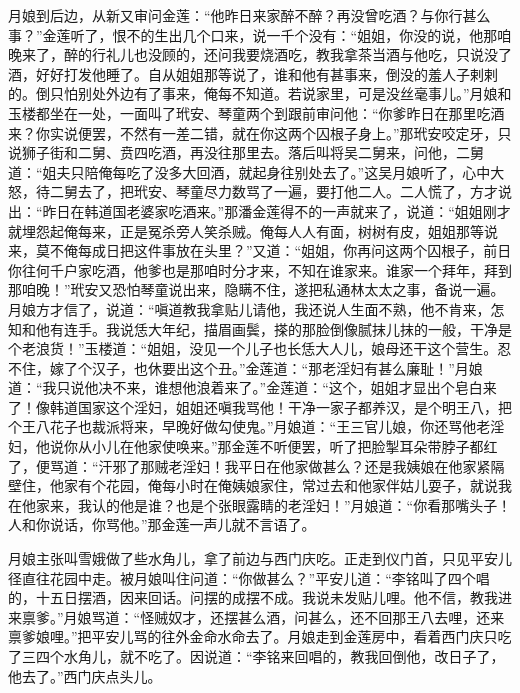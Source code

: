 月娘到后边，从新又审问金莲：“他昨日来家醉不醉？再没曾吃酒？与你行甚么事？”金莲听了，恨不的生出几个口来，说一千个没有：“姐姐，你没的说，他那咱晚来了，醉的行礼儿也没顾的，还问我要烧酒吃，教我拿茶当酒与他吃，只说没了酒，好好打发他睡了。自从姐姐那等说了，谁和他有甚事来，倒没的羞人子剌剌的。倒只怕别处外边有了事来，俺每不知道。若说家里，可是没丝毫事儿。”月娘和玉楼都坐在一处，一面叫了玳安、琴童两个到跟前审问他：“你爹昨日在那里吃酒来？你实说便罢，不然有一差二错，就在你这两个囚根子身上。”那玳安咬定牙，只说狮子街和二舅、贲四吃酒，再没往那里去。落后叫将吴二舅来，问他，二舅道：“姐夫只陪俺每吃了没多大回酒，就起身往别处去了。”这吴月娘听了，心中大怒，待二舅去了，把玳安、琴童尽力数骂了一遍，要打他二人。二人慌了，方才说出：“昨日在韩道国老婆家吃酒来。”那潘金莲得不的一声就来了，说道：“姐姐刚才就埋怨起俺每来，正是冤杀旁人笑杀贼。俺每人人有面，树树有皮，姐姐那等说来，莫不俺每成日把这件事放在头里？”又道：“姐姐，你再问这两个囚根子，前日你往何千户家吃酒，他爹也是那咱时分才来，不知在谁家来。谁家一个拜年，拜到那咱晚！”玳安又恐怕琴童说出来，隐瞒不住，遂把私通林太太之事，备说一遍。月娘方才信了，说道：“嗔道教我拿贴儿请他，我还说人生面不熟，他不肯来，怎知和他有连手。我说恁大年纪，描眉画鬓，搽的那脸倒像腻抹儿抹的一般，干净是个老浪货！”玉楼道：“姐姐，没见一个儿子也长恁大人儿，娘母还干这个营生。忍不住，嫁了个汉子，也休要出这个丑。”金莲道：“那老淫妇有甚么廉耻！”月娘道：“我只说他决不来，谁想他浪着来了。”金莲道：“这个，姐姐才显出个皂白来了！像韩道国家这个淫妇，姐姐还嗔我骂他！干净一家子都养汉，是个明王八，把个王八花子也裁派将来，早晚好做勾使鬼。”月娘道：“王三官儿娘，你还骂他老淫妇，他说你从小儿在他家使唤来。”那金莲不听便罢，听了把脸掣耳朵带脖子都红了，便骂道：“汗邪了那贼老淫妇！我平日在他家做甚么？还是我姨娘在他家紧隔壁住，他家有个花园，俺每小时在俺姨娘家住，常过去和他家伴姑儿耍子，就说我在他家来，我认的他是谁？也是个张眼露睛的老淫妇！”月娘道：“你看那嘴头子！人和你说话，你骂他。”那金莲一声儿就不言语了。

月娘主张叫雪娥做了些水角儿，拿了前边与西门庆吃。正走到仪门首，只见平安儿径直往花园中走。被月娘叫住问道：“你做甚么？”平安儿道：“李铭叫了四个唱的，十五日摆酒，因来回话。问摆的成摆不成。我说未发贴儿哩。他不信，教我进来禀爹。”月娘骂道：“怪贼奴才，还摆甚么酒，问甚么，还不回那王八去哩，还来禀爹娘哩。”把平安儿骂的往外金命水命去了。月娘走到金莲房中，看着西门庆只吃了三四个水角儿，就不吃了。因说道：“李铭来回唱的，教我回倒他，改日子了，他去了。”西门庆点头儿。


